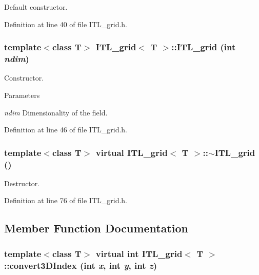 Default constructor. 



Definition at line 40 of file ITL\_\-grid.h.

\hypertarget{classITL__grid_a761ce2ffcfecbebac0abf6abd09c086c}{
\subsubsection[{ITL\_\-grid}]{\setlength{\rightskip}{0pt plus 5cm}template$<$class T$>$ {\bf ITL\_\-grid}$<$ T $>$::{\bf ITL\_\-grid} (int {\em ndim})}}
\label{classITL__grid_a761ce2ffcfecbebac0abf6abd09c086c}


Constructor. 


\begin{DoxyParams}{Parameters}
\item[{\em ndim}]Dimensionality of the field. \end{DoxyParams}


Definition at line 46 of file ITL\_\-grid.h.

\hypertarget{classITL__grid_a44d1b2ed1e6e15cbf4067468b7b9fa96}{
\subsubsection[{$\sim$ITL\_\-grid}]{\setlength{\rightskip}{0pt plus 5cm}template$<$class T$>$ virtual {\bf ITL\_\-grid}$<$ T $>$::$\sim${\bf ITL\_\-grid} ()}}
\label{classITL__grid_a44d1b2ed1e6e15cbf4067468b7b9fa96}


Destructor. 



Definition at line 76 of file ITL\_\-grid.h.



\subsection{Member Function Documentation}
\hypertarget{classITL__grid_a2a1731cce0351121768b5a104e601057}{
\subsubsection[{convert3DIndex}]{\setlength{\rightskip}{0pt plus 5cm}template$<$class T$>$ virtual int {\bf ITL\_\-grid}$<$ T $>$::convert3DIndex (int {\em x}, \/  int {\em y}, \/  int {\em z})}}
\label{classITL__grid_a2a1731cce0351121768b5a104e601057}


